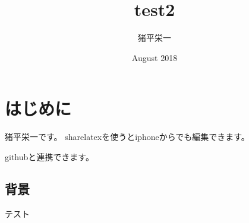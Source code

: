 \documentclass[12pt]{jarticle}
\title{test2}
\author{猪平栄一}
\date{August 2018}
\begin{document}
\maketitle

\section{はじめに}
猪平栄一です。
sharelatexを使うとiphoneからでも編集できます。

githubと連携できます。

\subsection{背景}
テスト
\end{document}
